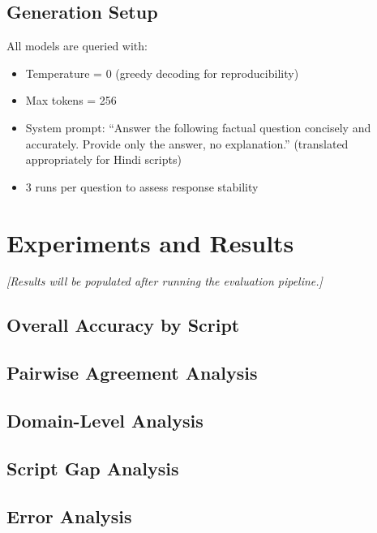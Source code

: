 \documentclass[11pt,a4paper]{article}
\begin{document}
\subsection{Generation Setup}
All models are queried with:
\begin{itemize}
    \item Temperature = 0 (greedy decoding for reproducibility)
    \item Max tokens = 256
    \item System prompt: ``Answer the following factual question concisely and accurately. Provide only the answer, no explanation.'' (translated appropriately for Hindi scripts)
    \item 3 runs per question to assess response stability
\end{itemize}

\section{Experiments and Results}
\label{sec:results}

\textit{[Results will be populated after running the evaluation pipeline.]}

\subsection{Overall Accuracy by Script}

\subsection{Pairwise Agreement Analysis}

\subsection{Domain-Level Analysis}

\subsection{Script Gap Analysis}

\subsection{Error Analysis}
\end{document}
